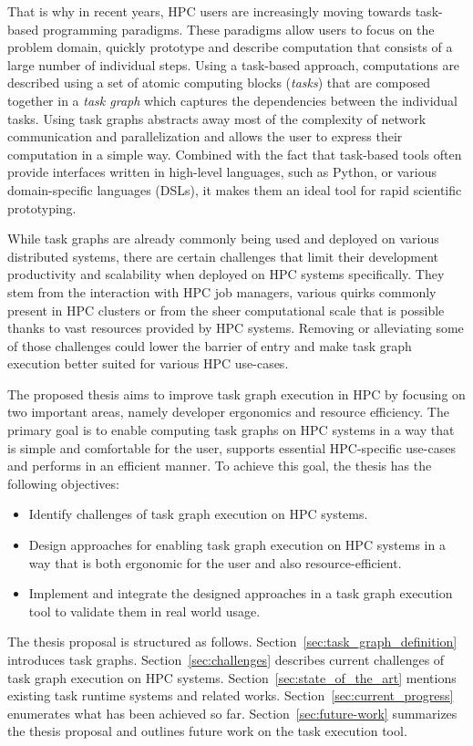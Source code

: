 That is why in recent years, HPC users are increasingly moving towards task-based programming
paradigms. These paradigms allow users to focus on the problem domain, quickly prototype and
describe computation that consists of a large number of individual steps. Using a task-based
approach, computations are described using a set of atomic computing blocks (\emph{tasks}) that
are composed together in a \emph{task graph} which captures the dependencies between the
individual tasks. Using task graphs abstracts away most of the complexity of network
communication and parallelization and allows the user to express their computation in a simple
way. Combined with the fact that task-based tools often provide interfaces written in high-level
languages, such as Python, or various domain-specific languages (DSLs), it makes them an ideal
tool for rapid scientific prototyping.

While task graphs are already commonly being used and deployed on various distributed systems,
there are certain challenges that limit their development productivity and scalability
when deployed on HPC systems specifically. They stem from the interaction with HPC job managers,
various quirks commonly present in HPC clusters or from the sheer computational scale that is
possible thanks to vast resources provided by HPC systems. Removing or alleviating some of those
challenges could lower the barrier of entry and make task graph execution better suited for
various HPC use-cases.

The proposed thesis aims to improve task graph execution in HPC by focusing on two important areas,
namely developer ergonomics and resource efficiency. The primary goal is to enable computing
task graphs on HPC systems in a way that is simple and comfortable for the user, supports
essential HPC-specific use-cases and performs in an efficient manner. To achieve this goal, the
thesis has the following objectives:
\begin{itemize}
    \item Identify challenges of task graph execution on HPC systems.
    \item Design approaches for enabling task graph execution
    on HPC systems in a way that is both ergonomic for the user and also resource-efficient.
    \item Implement and integrate the designed approaches in a task graph execution tool to
    validate them in real world usage.
\end{itemize}

The thesis proposal is structured as follows. Section~\ref{sec:task_graph_definition} introduces
task graphs. Section~\ref{sec:challenges} describes current challenges of task graph execution on
HPC systems. Section~\ref{sec:state_of_the_art} mentions existing task runtime systems and
related works. Section~\ref{sec:current_progress} enumerates what has been achieved so far.
Section~\ref{sec:future-work} summarizes the thesis proposal and outlines future work on the
\hyperqueue{} task execution tool.
